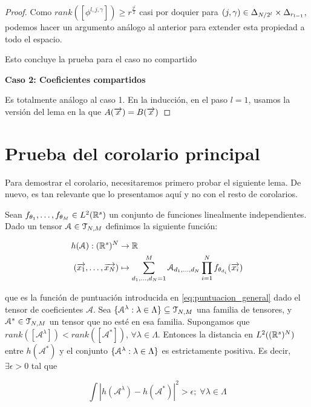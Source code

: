 \begin{proof}
    Como $rank([\phi^{l, j, \gamma}]) \geq r^{\frac{2^l}{2}}$ casi por doquier para $(j, \gamma) \in \Delta_{N/2^l} \times \Delta_{r_{l-1}}$, podemos hacer un argumento análogo al anterior para extender esta propiedad a todo el espacio.

    Esto concluye la prueba para el caso no compartido

    \textbf{Caso 2: Coeficientes compartidos}

    Es totalmente análogo al caso 1. En la inducción, en el paso $l = 1$, usamos la versión del lema  en la que $A(\overrightarrow{x}) = B(\overrightarrow{x})$
\end{proof}

\section{Prueba del corolario principal}

Para demostrar el corolario, necesitaremos primero probar el siguiente lema. De nuevo, es tan relevante que lo presentamos aquí y no con el resto de corolarios.

\begin{lema} \label{lema:lema_previo_corolario}
    Sean $f_{\theta_1}, \ldots, f_{\theta_M} \in L^2(\mathbb{R}^s)$ un conjunto de funciones linealmente independientes. Dado un tensor $\mathcal{A} \in \mathcal{T}_{N, M}$ definimos la siguiente función:

    \begin{equation}
    \begin{split}
        h(\mathcal{A}): (\mathbb{R}^s)^N &\to \mathbb{R} \\
        (\overrightarrow{x_1}, \ldots, \overrightarrow{x_N}) &\mapsto \sum_{d_1, \ldots, d_N = 1}^M \mathcal{A}_{d_1, \ldots, d_N} \prod_{i = 1}^N f_{\theta_{d_i}}(\overrightarrow{x_i})
    \end{split}
    \end{equation}

    que es la función de puntuación introducida en \eqref{eq:puntuacion_general} dado el tensor de coeficientes $\mathcal{A}$. Sea $\{ \mathcal{A}^\lambda: \lambda \in \Lambda \} \subseteq \mathcal{T}_{N, M}$ una familia de tensores, y $\mathcal{A}^* \in \mathcal{T}_{N, M}$ un tensor que no esté en esa familia. Supongamos que $rank([\mathcal{A}^\lambda]) < rank([\mathcal{A}^*])$, $\forall \lambda \in \Lambda$. Entonces la distancia en $L^2((\mathbb{R}^s)^N)$ entre $h(\mathcal{A}^*)$ y el conjunto $\{ \mathcal{A}^\lambda: \lambda \in \Lambda \}$ es estrictamente positiva. Es decir, $\exists \epsilon > 0$ tal que

    \begin{equation}
        \int |h(\mathcal{A}^\lambda) - h(\mathcal{A}^*)|^2 > \epsilon; \; \forall \lambda \in \Lambda
    \end{equation}
\end{lema}

